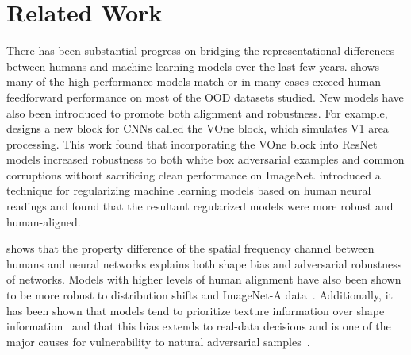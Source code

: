 \section{Related Work}
\label{sec:related}
There has been substantial progress on bridging the representational differences between humans and machine learning models over the last few years. \cite{geirhos_partial_2021} shows many of the high-performance models match or in many cases exceed human feedforward performance on most of the OOD datasets studied. New models have also been introduced to promote both alignment and robustness. For example, \cite{dapello_simulating_2020} designs a new block for CNNs called the VOne block, which simulates V1 area processing. This work found that incorporating the VOne block into ResNet models increased robustness to both white box adversarial examples and common corruptions without sacrificing clean performance on ImageNet. \cite{li_learning_2019} introduced a technique for regularizing machine learning models based on human neural readings and found that the resultant regularized models were more robust and human-aligned.


\cite{subramanian_spatial-frequency_2023} shows that the property difference of the spatial frequency channel between humans and neural networks explains both shape bias and adversarial robustness of networks. 
Models with higher levels of human alignment have also been shown to be more robust to distribution shifts and ImageNet-A data~\cite{sucholutsky_alignment_2023}. Additionally, it has been shown that models tend to prioritize texture information over shape information~\cite{geirhos_imagenet-trained_2019, hermann_origins_2020} and that this bias extends to real-data decisions and is one of the major causes for vulnerability to natural adversarial samples~\cite{hoak_err_2024, hoak_explorations_2024}.